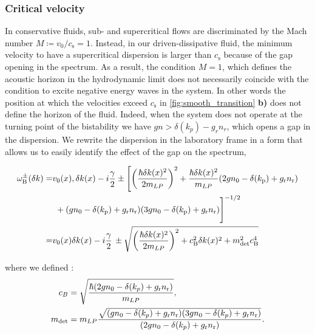\subsubsection{Critical velocity} In conservative fluids, sub- and supercritical flows are discriminated by the Mach number $M\coloneqq v_0/c_\mathrm{s}=1$.
Instead, in our driven-dissipative fluid, the minimum velocity to have a supercritical dispersion is larger than $c_\mathrm{s}$ because of the gap opening in the spectrum.
As a result, the condition $M=1$, which defines the acoustic horizon in the hydrodynamic limit does not necessarily coincide with the condition to excite negative energy waves in the system. In other words the position at 
which the velocities exceed $c_\mathrm{s}$ in \autoref{fig:smooth_transition} \textbf{b)} does not define the horizon of the fluid. Indeed, when the system does not operate at the turning
point of the bistability we have $gn>\delta(k_p)-g_rn_r$, which opens a gap in the dispersion. We rewrite the dispersion in the laboratory frame in a form that allows us to easily identify the effect of the gap on the spectrum,


\begin{align}\label{eq:lfbogom}
    \omega^\pm_\mathrm{B}(\delta k)=&v_0(x) ,\delta k(x)-i\frac{\gamma}{2}\nonumber\pm\Biggl[\left(\frac{\hbar\delta k(x)^2}{2 m_{LP}}\right)^2+\frac{\hbar \delta k(x)^2}{m_{LP}}(2g n_0 - \delta(k_\mathrm{p})+g_\mathrm{r}n_\mathrm{r})\\
    &\,\,+(g n_0 - \delta(k_\mathrm{p})+g_\mathrm{r}n_\mathrm{r})(3 g n_0 - \delta(k_\mathrm{p})+g_\mathrm{r}n_\mathrm{r})\Biggr]^{-1/2}\nonumber\\
    =&v_0(x) \delta k(x)-i\frac{\gamma}{2}\,\pm\sqrt{\left(\frac{\hbar\delta k(x)^2}{2 m_{LP}}\right)^2+c_\mathrm{B}^2\delta k(x)^2+m_{\mathrm{det}}^2c_\mathrm{B}^4}
\end{align}

where we defined :
\begin{subequations}
    \label{eq:m_bog}
    \begin{align}
    c_B & = \sqrt{\dfrac{\hbar(2gn_0- \delta(k_p)+g_\mathrm{r}n_\mathrm{r})}{m_{LP}}},\\
    m_{\mathrm{det}}&=m_{LP}\dfrac{\sqrt{(gn_0- \delta(k_p)+g_\mathrm{r}n_\mathrm{r})(3gn_0- \delta(k_p)+g_\mathrm{r}n_\mathrm{r})}}{(2gn_0- \delta(k_p)+g_\mathrm{r}n_\mathrm{r})}.
    \end{align}
\end{subequations}

